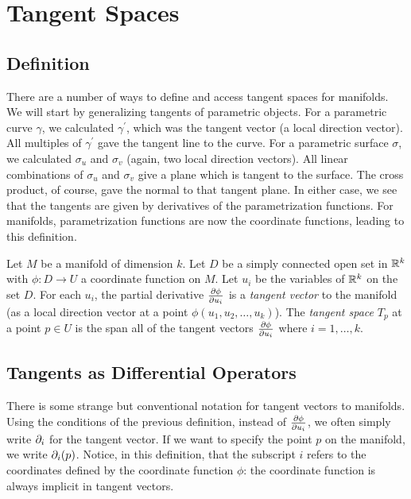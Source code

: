 \documentclass[fleqn,letterpaper]{report}
\begin{document}
\section{Tangent Spaces}
\label{tangent-spaces}

\subsection{Definition} 
\label{tangent-spaces-definition}

There are a number of ways to define and access tangent spaces
for manifolds. We will start by generalizing tangents of
parametric objects. For a parametric curve $\gamma$, we
calculated $\gamma^\prime$, which was the tangent vector (a
local direction vector). All multiples of $\gamma^\prime$ gave
the tangent line to the curve. For a parametric surface
$\sigma$, we calculated $\sigma_u$ and $\sigma_v$ (again, two
local direction vectors). All linear combinations of
$\sigma_u$ and $\sigma_v$ give a plane which is tangent to the
surface. The cross product, of course, gave the normal to
that tangent plane. In either case, we see that the tangents
are given by derivatives of the parametrization functions. For
manifolds, parametrization functions are now the coordinate
functions, leading to this definition. 

\begin{defn}
Let $M$ be a manifold of dimension $k$. Let $D$ be a simply
connected open set in $\mathbb{R}^k$ with $\phi:D \rightarrow U$ a
coordinate function on $M$. Let $u_i$ be the variables of
$\mathbb{R}^k$ on the set $D$. For each $u_i$, the partial
derivative $\frac{\partial \phi}{\partial u_i}$ is a \emph{tangent
vector} to the manifold (as a local direction vector at a
point $\phi(u_1, u_2, \ldots, u_k)$). The \emph{tangent space}
$T_p$ at a point $p \in U$ is the span all of the tangent vectors
$\frac{\partial \phi}{\partial u_i}$ where $i = 1, \ldots, k$. 
\end{defn}

\subsection{Tangents as Differential Operators}
\label{tangents-differential-operators}

There is some strange but conventional notation for tangent
vectors to manifolds. Using the conditions of the previous
definition, instead of $\frac{\partial \phi}{\partial u_i}$, we often
simply write $\partial_i$ for the tangent vector. If we want to
specify the point $p$ on the manifold, we write $\partial_i(p)$.
Notice, in this definition, that the subscript $i$ refers to
the coordinates defined by the coordinate function $\phi$: the
coordinate function is always implicit in tangent vectors.
\end{document}
